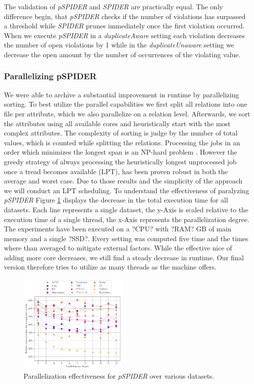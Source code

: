 The validation of \textit{pSPIDER} and \textit{SPIDER} are practically equal. The only difference begin, that \textit{pSPIDER} checks if the number of violations has surpassed a threshold while \textit{SPIDER} prunes immediately once the first violation occurred. When we execute \textit{pSPIDER} in a \textit{duplicateAware} setting each violation decreases the number of open violations by 1 while in the \textit{duplicateUnaware} setting we decrease the open amount by the number of occurrences of the violating value.

\subsubsection{\textbf{Parallelizing pSPIDER}}
We were able to archive a substantial improvement in runtime by parallelizing sorting. To best utilize the parallel capabilities we first split all relations into one file per attribute, which we also parallelize on a relation level. Afterwards, we sort the attributes using all available cores and heuristically start with the most complex attributes. The complexity of sorting is judge by the number of total values, which is counted while splitting the relations. Processing the jobs in an order which minimizes the longest span is an NP-hard problem \cite{graham1979optimization}. However the greedy strategy of always processing the heuristically longest unprocessed job once a tread becomes available (LPT), has been proven robust in both the average and worst case. Due to those results and the simplicity of the approach we will conduct an LPT scheduling. To understand the effectiveness of paralyzing \textit{pSPIDER} Figure \ref{fig:parallel_spider} displays the decrease in the total execution time for all datasets. Each line represents a single dataset, the y-Axis is scaled relative to the execution time of a single thread, the x-Axis represents the parallelization degree. The experiments have been executed on a ?CPU? with ?RAM? GB of main memory and a single ?SSD?. Every setting was computed five time and the times where than averaged to mitigate external factors. While the effective nice of adding more core decreases, we still find a steady decrease in runtime. Our final version therefore tries to utilize as many threads as the machine offers.

\begin{figure}
    \centering
    \includegraphics[width=0.475\textwidth]{figures/spider_parallel.pdf}
    \caption{Parallelization effectiveness for \textit{pSPIDER} over various datasets.}
    \label{fig:parallel_spider}
\end{figure}
